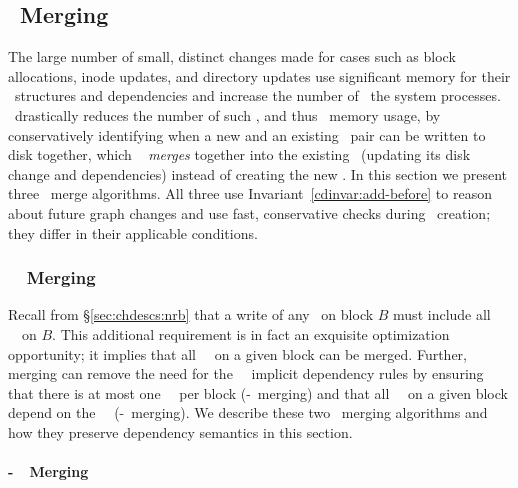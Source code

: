 \subsection{\ChDesc\ Merging}
\label{sec:patch:merge}

The large number of small, distinct changes made for cases such as
block allocations, inode updates, and directory updates use
significant memory for their \chdesc\ structures and dependencies and
increase the number of \chdescs\ the system processes.
%
\Kudos\ drastically reduces the number of such \chdescs, and thus
\chdesc\ memory usage, by conservatively identifying when a new and an
existing \chdesc\ pair can be written to disk together, which \Kudos\
%
\emph{merges} together into the existing \chdesc\ (updating its disk
change and dependencies) instead of creating the new \chdesc.
%
In this section we present three \chdesc\ merge algorithms. All three
use Invariant~\ref{cdinvar:add-before} to reason about future graph
changes and use fast, conservative checks during \chdesc\ creation; they
differ in their applicable conditions.

\subsubsection{\Nrb\ \ChDesc\ Merging}
\label{sec:chdescs:merge:nrb}

Recall from \S\ref{sec:chdescs:nrb} that a write of any \chdescs\ on block
$B$ must include all \nrb\ \chdescs\ on $B$.
%
This additional requirement is in fact an exquisite optimization
opportunity; it implies that all \nrb\ \chdescs\ on a given block can
be merged.
%
Further, merging can remove the need for the \nrb\ \chdesc\ implicit
dependency rules by ensuring that
%
there is at most one \nrb\ \chdesc\ per block (\nrb-\nrb\ merging)
%
and that all \rb\ \chdescs\ on a given block depend on the \nrb\ \chdesc\
(\nrb-\rb\ merging).
%
We describe these two \chdesc\ merging algorithms and how they
preserve dependency semantics in this section.

\paragraph{\Nrb-\Nrb\ \ChDesc\ Merging}
\label{sec:chdescs:merge:nrb:hard-hard}

